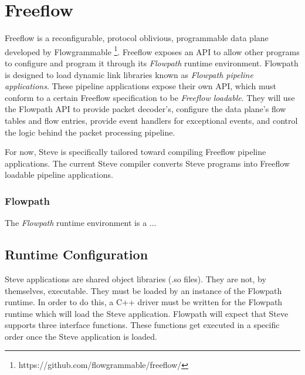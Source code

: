 \chapter{Freeflow} \label{ch:flowpath}

Freeflow is a reconfigurable, protocol oblivious, programmable data plane developed by Flowgrammable \footnote{https://github.com/flowgrammable/freeflow/}. Freeflow exposes an API to allow other programs to configure and program it through its \textit{Flowpath} runtime environment. Flowpath is designed to load dynamic link libraries known as \textit{Flowpath pipeline applications}. These pipeline applications expose their own API, which must conform to a certain Freeflow specification to be \textit{Freeflow loadable}. 
They will use the Flowpath API to provide packet decoder's, configure the data plane's flow tables and flow entries, provide event handlers for exceptional events, and control the logic behind the packet processing pipeline.

For now, Steve is specifically tailored toward compiling Freeflow pipeline applications. The current Steve compiler converts Steve programs into Freeflow loadable pipeline applications. 

\subsection{Flowpath}

The \textit{Flowpath} runtime environment is a ...

\section{Runtime Configuration} \label{config_guide}

Steve applications are shared object libraries (.so files). They are not, by themselves, executable. They must be loaded by an instance of the Flowpath runtime. In order to do this, a C++ driver must be written for the Flowpath runtime which will load the Steve application. Flowpath will expect that Steve supports three interface functions. These functions get executed in a specific order once the Steve application is loaded.

